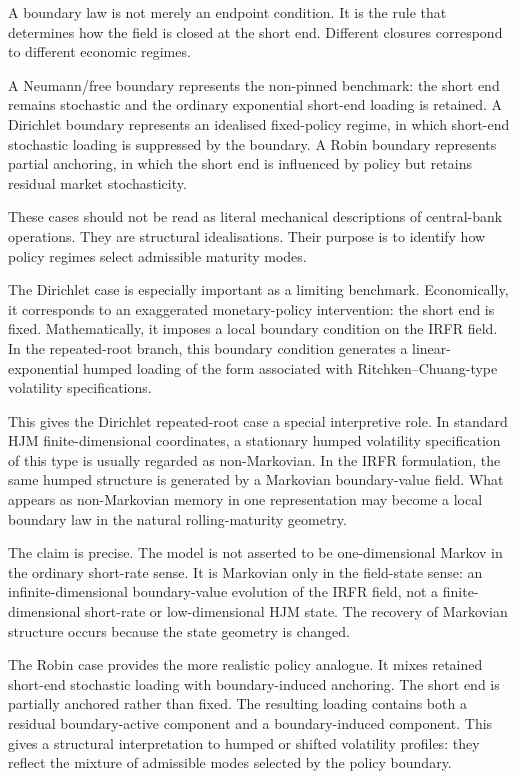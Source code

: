 \documentclass[11pt,oneside]{book}
\begin{document}
A boundary law is not merely an endpoint condition. It is the rule that
determines how the field is closed at the short end. Different closures
correspond to different economic regimes.

A Neumann/free boundary represents the non-pinned benchmark: the short
end remains stochastic and the ordinary exponential short-end loading is
retained. A Dirichlet boundary represents an idealised fixed-policy
regime, in which short-end stochastic loading is suppressed by the
boundary. A Robin boundary represents partial anchoring, in which the
short end is influenced by policy but retains residual market
stochasticity.

These cases should not be read as literal mechanical descriptions of
central-bank operations. They are structural idealisations. Their
purpose is to identify how policy regimes select admissible maturity
modes.

The Dirichlet case is especially important as a limiting benchmark.
Economically, it corresponds to an exaggerated monetary-policy
intervention: the short end is fixed. Mathematically, it imposes a local
boundary condition on the IRFR field. In the repeated-root branch, this
boundary condition generates a linear-exponential humped loading of the
form associated with Ritchken--Chuang-type volatility specifications.

This gives the Dirichlet repeated-root case a special interpretive role.
In standard HJM finite-dimensional coordinates, a stationary humped
volatility specification of this type is usually regarded as
non-Markovian. In the IRFR formulation, the same humped structure is
generated by a Markovian boundary-value field. What appears as
non-Markovian memory in one representation may become a local boundary
law in the natural rolling-maturity geometry.

The claim is precise. The model is not asserted to be one-dimensional
Markov in the ordinary short-rate sense. It is Markovian only in the
field-state sense: an infinite-dimensional boundary-value evolution of
the IRFR field, not a finite-dimensional short-rate or low-dimensional
HJM state. The recovery of Markovian structure occurs because the state
geometry is changed.

The Robin case provides the more realistic policy analogue. It mixes
retained short-end stochastic loading with boundary-induced anchoring.
The short end is partially anchored rather than fixed. The resulting
loading contains both a residual boundary-active component and a
boundary-induced component. This gives a structural interpretation to
humped or shifted volatility profiles: they reflect the mixture of
admissible modes selected by the policy boundary.
\end{document}
